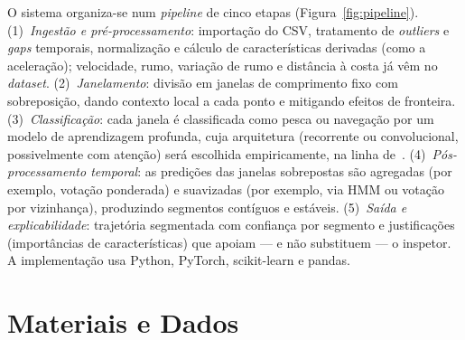 \documentclass{article}
\begin{document}
O sistema organiza-se num \emph{pipeline} de cinco etapas (Figura~\ref{fig:pipeline}). (1)~\emph{Ingestão e pré-processamento}: importação do CSV, tratamento de \emph{outliers} e \emph{gaps} temporais, normalização e cálculo de características derivadas (como a aceleração); velocidade, rumo, variação de rumo e distância à costa já vêm no \emph{dataset}. (2)~\emph{Janelamento}: divisão em janelas de comprimento fixo com sobreposição, dando contexto local a cada ponto e mitigando efeitos de fronteira. (3)~\emph{Classificação}: cada janela é classificada como pesca ou navegação por um modelo de aprendizagem profunda, cuja arquitetura (recorrente ou convolucional, possivelmente com atenção) será escolhida empiricamente, na linha de~\cite{cheng2025,wang2026}. (4)~\emph{Pós-processamento temporal}: as predições das janelas sobrepostas são agregadas (por exemplo, votação ponderada) e suavizadas (por exemplo, via HMM ou votação por vizinhança), produzindo segmentos contíguos e estáveis. (5)~\emph{Saída e explicabilidade}: trajetória segmentada com confiança por segmento e justificações (importâncias de características) que apoiam --- e não substituem --- o inspetor. A implementação usa Python, PyTorch, scikit-learn e pandas.

\begin{center}
\label{fig:pipeline}
\end{center}

\section{Materiais e Dados}
\label{sec:materiais-dados}
\end{document}
